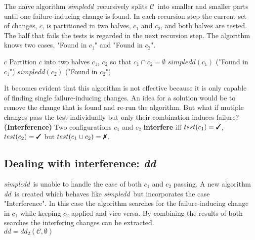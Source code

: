 \documentclass[a4paper,UKenglish]{lipics-v2018}
\newcommand{\sdd}[0]{\textit{simpledd}}
\newcommand{\dd}[0]{\textit{dd}}
\newcommand{\C}[0]{\ensuremath{\mathcal{C}}}
\newcommand{\cmark}{\text{\ding{51}}}
\newcommand{\xmark}{\text{\ding{55}}}
\newcommand{\defsub}[1]{\textbf{(#1)} }
\begin{document}
The na\"ive algorithm \sdd\ recursively splits \C\ into smaller and smaller parts until one failure-inducing change is found. In each recursion step the current set of changes, $c$, is partitioned in two halves, $c_1$ and $c_2$, and both halves are tested. The half that fails the tests is regarded in the next recursion step. The algorithm knows two cases, "Found in $c_1$" and "Found in $c_2$". \\

\begin{algorithmic}[1]
		\Function{simpledd}{$c: 2^{\C}$}
			 \Return $c$ \EndIf
			\State Partition $c$ into two halves $c_1$, $c_2$ so that $c_1 \cap c_2 = \emptyset$
			\If{($test(c_1) = \xmark$)} \Return $simpledd(c_1)$ \Comment("Found in $c_1$") \Else{} \Return $simpledd(c_2)$ \Comment("Found in $c_2$")
			\EndIf
		\EndFunction
\end{algorithmic}

It becomes evident that this algorithm is not effective because it is only capable of finding single failure-inducing changes. An idea for a solution would be to remove the change that is found and re-run the algorithm. But what if mutiple changes pass the test individually but only their combination induces failure? \\

 \defsub{Interference} Two configurations $c_1$ and $c_2$ \textbf{interfere} iff $test(c_1) = \cmark$, $test(c_2) = \cmark$ but $test(c_1 \cup c_2) = \xmark$.

\subsection{Dealing with interference: \dd}

\sdd\ is unable to handle the case of both $c_1$ and $c_2$ passing. A new algorithm \dd\ is created which behaves like \sdd\ but incorporates the case "Interference". In this case the algorithm searches for the failure-inducing change in $c_1$ while keeping $c_2$ applied and vice versa. By combining the results of both searches the interfering changes can be extracted. \\[.5em]

$dd = dd_2(\C, \emptyset)$ \\
\end{document}
